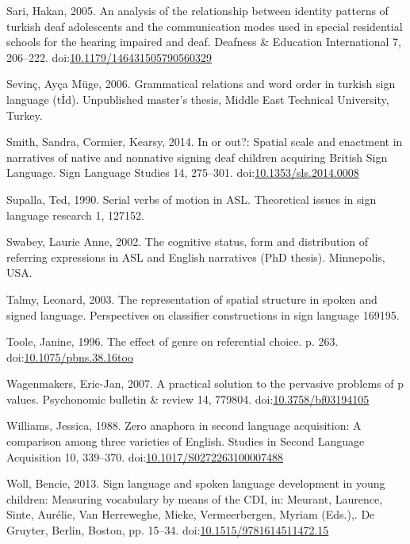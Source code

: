 \documentclass[]{elsarticle} %
\newlength{\cslhangindent}
\newenvironment{CSLReferences}[2] %
 {%
  \setlength{\parindent}{0pt}
  \ifodd #1 \everypar{\setlength{\hangindent}{\cslhangindent}}\ignorespaces\fi
  \ifnum #2 > 0
  \setlength{\parskip}{#2\baselineskip}
  \fi
 }%
 {}
\begin{document}
\begin{CSLReferences}{1}{0}
\leavevmode{}%
Sari, Hakan, 2005. An analysis of the relationship between identity
patterns of turkish deaf adolescents and the communication modes used in
special residential schools for the hearing impaired and deaf. Deafness
\& Education International 7, 206--222.
doi:\href{https://doi.org/10.1179/146431505790560329}{10.1179/146431505790560329}

\leavevmode{}%
Sevinç, Ayça Müge, 2006. Grammatical relations and word order in turkish
sign language (t{İ}d). Unpublished master's thesis, Middle East
Technical University, Turkey.

\leavevmode{}%
Smith, Sandra, Cormier, Kearsy, 2014. In or out?: Spatial scale and
enactment in narratives of native and nonnative signing deaf children
acquiring British Sign Language. Sign Language Studies 14, 275--301.
doi:\href{https://doi.org/10.1353/sls.2014.0008}{10.1353/sls.2014.0008}

\leavevmode{}%
Supalla, Ted, 1990. Serial verbs of motion in ASL. Theoretical issues in
sign language research 1, 127152.

\leavevmode{}%
Swabey, Laurie Anne, 2002. The cognitive status, form and distribution
of referring expressions in ASL and English narratives (PhD thesis).
Minnepolis, USA.

\leavevmode{}%
Talmy, Leonard, 2003. The representation of spatial structure in spoken
and signed language. Perspectives on classifier constructions in sign
language 169195.

\leavevmode{}%
Toole, Janine, 1996. The effect of genre on referential choice. p. 263.
doi:\href{https://doi.org/10.1075/pbns.38.16too}{10.1075/pbns.38.16too}

\leavevmode{}%
Wagenmakers, Eric-Jan, 2007. A practical solution to the pervasive
problems of p values. Psychonomic bulletin \& review 14, 779804.
doi:\href{https://doi.org/10.3758/bf03194105}{10.3758/bf03194105}

\leavevmode{}%
Williams, Jessica, 1988. Zero anaphora in second language acquisition: A
comparison among three varieties of English. Studies in Second Language
Acquisition 10, 339--370.
doi:\href{https://doi.org/10.1017/S0272263100007488}{10.1017/S0272263100007488}

\leavevmode{}%
Woll, Bencie, 2013. Sign language and spoken language development in
young children: Measuring vocabulary by means of the CDI, in: Meurant,
Laurence, Sinte, Aurélie, Van Herreweghe, Mieke, Vermeerbergen, Myriam
(Eds.),. De Gruyter, Berlin, Boston, pp. 15--34.
doi:\href{https://doi.org/10.1515/9781614511472.15}{10.1515/9781614511472.15}

\end{CSLReferences}
\end{document}
